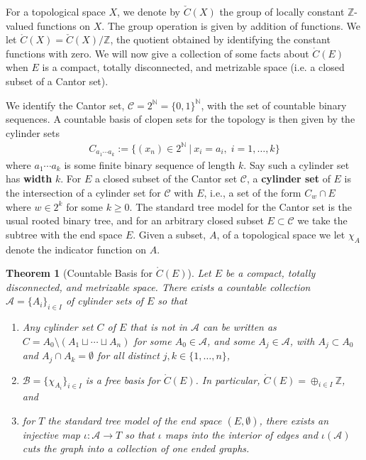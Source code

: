 \documentclass[11pt]{amsart}
\theoremstyle{plain}
\newtheorem{THM}{Theorem}[section]
\theoremstyle{definition}
\newcommand{\N}{\mathbb{N}}
\newcommand{\Z}{\mathbb{Z}}
\newcommand{\cC}{\mathcal{C}}
\newcommand{\cA}{\mathcal{A}}
\newcommand{\defeq}{:=}
\newcommand{\<}{\langle}
\renewcommand{\>}{\rangle}
\newcommand{\ceC}{\check{C}}
\newcommand{\dC}{\mathring{C}}
\begin{document}
For a topological space $X$, we denote by $\ceC(X)$ the group of locally constant $\Z$-valued functions on $X$. The group operation is given by addition of functions. We let $\dC(X) = \ceC(X)/\Z$, the quotient obtained by identifying the constant functions with zero. We will now give a collection of some facts about $\dC(E)$ when $E$ is a compact, totally disconnected, and metrizable space (i.e. a closed subset of a Cantor set).

We identify the Cantor set, $\cC = 2^{\N} = \{0,1\}^{\N}$, with the set of countable binary sequences. A countable basis of clopen sets for the topology is then given by the cylinder sets
    \begin{align*}
        C_{a_{1}\cdots a_{k}} \defeq \{ (x_{n}) \in 2^{\N}\ \vert\ x_{i} = a_{i}, \; i=1,\ldots, k\}
    \end{align*}
where $a_{1}\cdots a_{k}$ is some finite binary sequence of length $k$. Say such a cylinder set has \textbf{width} $k$. For $E$ a closed subset of the Cantor set $\cC$, a \textbf{cylinder set} of $E$ is the intersection of a cylinder set for $\cC$ with $E$, i.e., a set of the form $C_{w} \cap E$ where $w \in 2^{k}$ for some $k \ge 0$. The standard tree model for the Cantor set is the usual rooted binary tree, and for an arbitrary closed subset $E \subset \cC$ we take the subtree with the end space $E$.
Given a subset, $A$, of a topological space we let $\chi_{A}$ denote the indicator function on $A$. 

\begin{THM}[Countable Basis for $\dC(E)$]\label{thm:chombasis}
\setlength{\itemsep}{5pt}
    Let $E$ be a compact, totally disconnected, and metrizable space. There exists a countable collection $\cA=\{A_i\}_{i \in I}$ of cylinder sets of $E$ so that 
    \begin{enumerate}
        \item Any cylinder set $C$ of $E$ that is not in $\cA$ can be written as $C = A_0 \setminus (A_{1} \sqcup \cdots \sqcup A_{n})$ for some $A_0\in \cA$, and some $A_{j} \in \cA$, with $A_j\subset A_0$ and $A_{j} \cap A_{k} = \emptyset$ for all distinct $j,k \in \{1,\ldots,n\}$,
        \item $\mathcal{B} = \{\chi_{A_{i}}\}_{i\in I}$ is a free basis for $\dC(E)$. In particular, $\dC(E) = \oplus_{i\in I} \Z$, and
        \item for $T$ the standard tree model of the end space $(E,\emptyset)$, there exists an injective map $\iota:\cA \rightarrow T$ so that $\iota$ maps into the interior of edges and $\iota(\cA)$ cuts the graph into a collection of one ended graphs. 
    \end{enumerate}
    
\end{THM}
\end{document}
